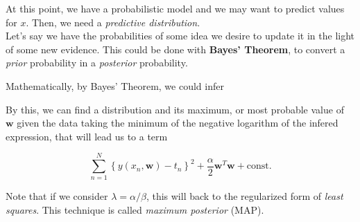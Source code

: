 \begin{frame}{\insertsubsection}

At this point, we have a probabilistic model and we may want to predict values for $x$. Then, we need a \textit{predictive distribution}. \\
\vspace{1em}
Let's say we have the probabilities of some idea we desire to update it in the light of some new evidence. This could be done with \textbf{Bayes' Theorem}, to convert a \textit{prior} probability in a \textit{posterior} probability. \\
\end{frame}

\begin{frame}{\insertsubsection}
Mathematically, by Bayes' Theorem, we could infer
\end{frame}

\begin{frame}{\insertsubsection}
By this, we can find a distribution and its maximum, or most probable value of $\mathbf{w}$ given the data taking the minimum of the negative logarithm of the infered expression, that will lead us to a term

\begin{equation*}
\sum^N_{n=1} \left\{ y(x_n, \mathbf{w}) - t_n \right\}^2 + \frac{\alpha}{2} \mathbf{w}^T\mathbf{w} + \text{const.}
\end{equation*}

Note that if we consider $\lambda = \alpha / \beta$, this will back to the regularized form of \textit{least squares}. This technique is called \textit{maximum posterior} (MAP).
\end{frame}

